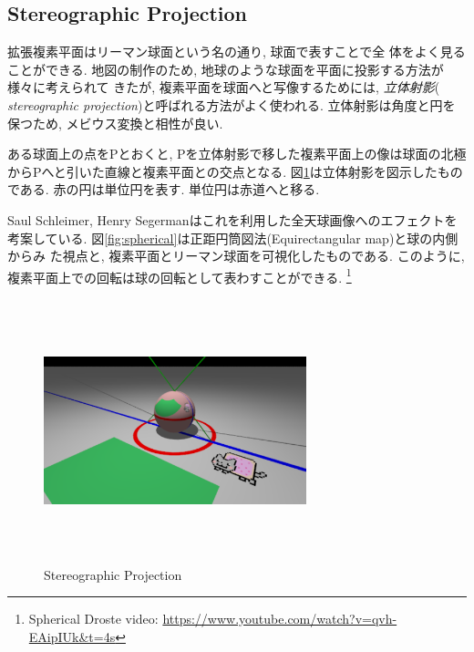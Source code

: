 \subsection{Stereographic Projection}

拡張複素平面はリーマン球面という名の通り, 球面で表すことで全
体をよく見ることができる.
地図の制作のため, 地球のような球面を平面に投影する方法が様々に考えられて
きたが, 複素平面を球面へと写像するためには, \emph{立体射影}({\it
stereographic projection})と呼ばれる方法がよく使われる.
立体射影は角度と円を保つため, メビウス変換と相性が良い.

ある球面上の点をPとおくと, Pを立体射影で移した複素平面上の像は球面の北極
からPへと引いた直線と複素平面との交点となる.
図\ref{fig:stereoProject}は立体射影を図示したものである.
赤の円は単位円を表す. 単位円は赤道へと移る.

Saul Schleimer, Henry Segermanはこれを利用した全天球画像へのエフェクトを
考案している\cite{spherical}.
図\ref{fig:spherical}は正距円筒図法(Equirectangular map)と球の内側からみ
た視点と, 複素平面とリーマン球面を可視化したものである.
このように, 複素平面上での回転は球の回転として表わすことができる.
\footnote{Spherical Droste video: \url{https://www.youtube.com/watch?v=qvh-EAipIUk\&t=4s}}

\begin{figure}[htbp]
 \center
 \includegraphics[width=3in, height=3in, keepaspectratio]{../img/klein/stereoProject.pdf}
 \caption{Stereographic Projection}
 \label{fig:stereoProject}
\end{figure}

